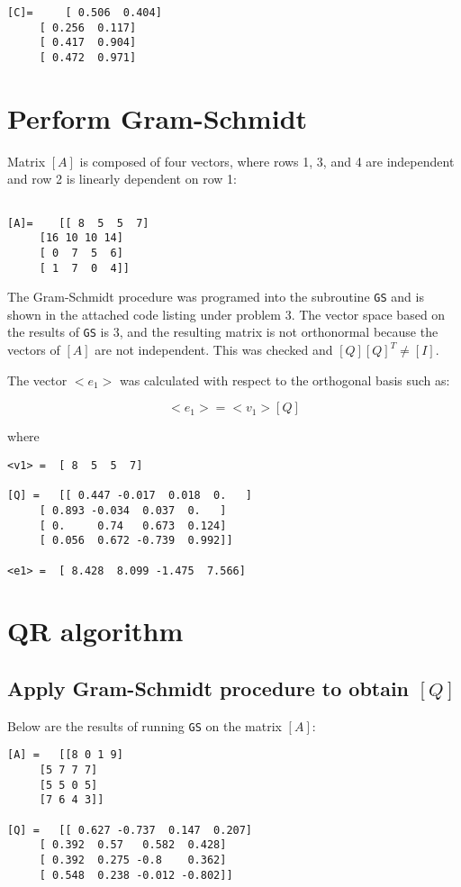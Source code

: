 \documentclass[letterpaper, 10pt, oneside]{article}
\begin{document}
\begin{lstlisting}
[C]=	 [ 0.506  0.404]
	 [ 0.256  0.117]
	 [ 0.417  0.904]
	 [ 0.472  0.971]
\end{lstlisting}

\section{Perform Gram-Schmidt}

Matrix $[A]$ is composed of four vectors, where rows 1, 3, and 4 are independent and row 2 is linearly dependent on row 1:
\begin{lstlisting}

[A]=	[[ 8  5  5  7]
	 [16 10 10 14]
	 [ 0  7  5  6]
	 [ 1  7  0  4]]
\end{lstlisting}

The Gram-Schmidt procedure was programed into the subroutine \verb|GS| and is shown in the attached code listing under problem 3.  The vector space based on the results of \verb|GS| is 3, and the resulting matrix is not orthonormal because the vectors of $[A]$ are not independent. This was checked and $[Q][Q]^T \ne [I]$.

The vector $<e_1>$ was calculated with respect to the orthogonal basis such as:

$$<e_1> = <v_1>[Q]$$ 

where

\begin{lstlisting}
<v1> = 	[ 8  5  5  7]

[Q] = 	[[ 0.447 -0.017  0.018  0.   ]
	 [ 0.893 -0.034  0.037  0.   ]
	 [ 0.     0.74   0.673  0.124]
	 [ 0.056  0.672 -0.739  0.992]]

<e1> = 	[ 8.428  8.099 -1.475  7.566]
\end{lstlisting}

\section{QR algorithm}

\subsection{Apply Gram-Schmidt procedure to obtain $[Q]$}
Below are the results of running \verb|GS| on the matrix $[A]$:
\begin{lstlisting}
[A] = 	[[8 0 1 9]
	 [5 7 7 7]
	 [5 5 0 5]
	 [7 6 4 3]]

[Q] = 	[[ 0.627 -0.737  0.147  0.207]
	 [ 0.392  0.57   0.582  0.428]
	 [ 0.392  0.275 -0.8    0.362]
	 [ 0.548  0.238 -0.012 -0.802]]
\end{lstlisting}
\end{document}
